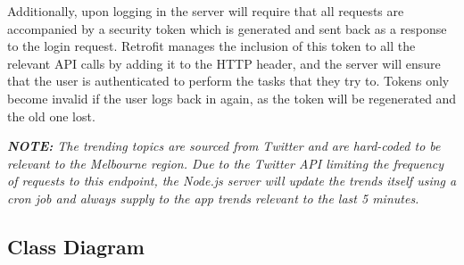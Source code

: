 \documentclass[11pt,english,numbers=endperiod,parskip=half]{scrartcl}
\begin{document}
  Additionally, upon logging in the server will require that all requests are
  accompanied by a security token which is generated and sent back as a response
  to the login request. Retrofit manages the inclusion of this token to all
  the relevant API calls by adding it to the HTTP header, and the server will
  ensure that the user is authenticated to perform the tasks that they try to.
  Tokens only become invalid if the user logs back in again, as the token will
  be regenerated and the old one lost.

  \textit{\textbf{NOTE: }The trending topics are sourced from Twitter and are
  hard-coded to be relevant to the Melbourne region. Due to the Twitter API
  limiting the frequency of requests to this endpoint, the Node.js server will
  update the trends itself using a cron job and always supply to the app trends
  relevant to the last 5 minutes.}
  \newpage
  \subsection{Class Diagram}
    \begin{figure}[H]
    \end{figure}
\end{document}
